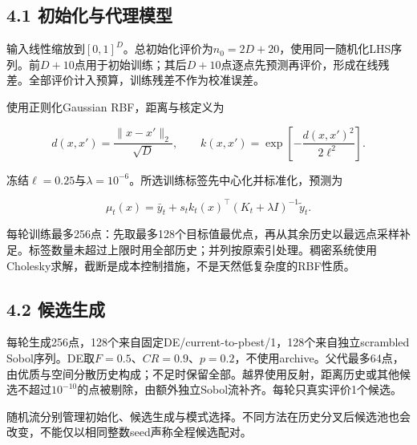 \documentclass[11pt,a4paper]{article}
\begin{document}
\hypertarget{ux521dux59cbux5316ux4e0eux4ee3ux7406ux6a21ux578b}{%
\subsection{4.1
初始化与代理模型}\label{ux521dux59cbux5316ux4e0eux4ee3ux7406ux6a21ux578b}}

输入线性缩放到\([0,1]^D\)。总初始化评价为\(n_0=2D+20\)，使用同一随机化LHS序列。前\(D+10\)点用于初始训练；其后\(D+10\)点逐点先预测再评价，形成在线残差。全部评价计入预算，训练残差不作为校准误差。

\par\noindent\begin{minipage}{\linewidth}

使用正则化Gaussian RBF，距离与核定义为

\[
d(x,x')=\frac{\|x-x'\|_2}{\sqrt D},\qquad k(x,x')=\exp\left[-\frac{d(x,x')^2}{2\ell^2}\right].
\]

\end{minipage}\par

\par\noindent\begin{minipage}{\linewidth}

冻结\(\ell=0.25\)与\(\lambda=10^{-6}\)。所选训练标签先中心化并标准化，预测为

\[
\mu_t(x)=\bar y_t+s_t k_t(x)^\top(K_t+\lambda I)^{-1}\widetilde y_t.
\]

\end{minipage}\par

每轮训练最多256点：先取最多128个目标值最优点，再从其余历史以最远点采样补足。标签数量未超过上限时用全部历史；并列按原索引处理。稠密系统使用Cholesky求解，截断是成本控制措施，不是天然低复杂度的RBF性质。

\hypertarget{ux5019ux9009ux751fux6210}{%
\subsection{4.2 候选生成}\label{ux5019ux9009ux751fux6210}}

每轮生成256点，128个来自固定DE/current-to-pbest/1，128个来自独立scrambled
Sobol序列。DE取\(F=0.5\)、\(CR=0.9\)、\(p=0.2\)，不使用archive。父代最多64点，由优质与空间分散历史构成；不足时保留全部。越界使用反射，距离历史或其他候选不超过\(10^{-10}\)的点被剔除，由额外独立Sobol流补齐。每轮只真实评价1个候选。

随机流分别管理初始化、候选生成与模式选择。不同方法在历史分叉后候选池也会改变，不能仅以相同整数seed声称全程候选配对。
\end{document}
